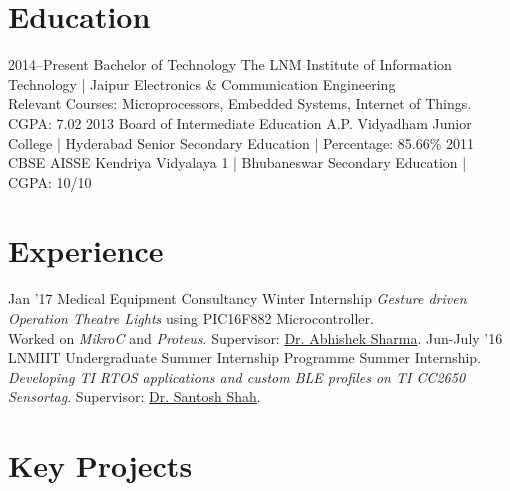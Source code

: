 \documentclass[]{friggeri-cv}
\begin{document}
\section{Education}

\begin{entrylist}
   \entry
    {2014–Present}
    {Bachelor of Technology}
    {The LNM Institute of Information Technology | Jaipur}
    {Electronics \& Communication Engineering\\Relevant Courses: Microprocessors, Embedded Systems, Internet of Things.\\CGPA: 7.02}
  \entry
    {2013}
    {Board of Intermediate Education A.P.}
    {Vidyadham Junior College | Hyderabad}
    {Senior Secondary Education | Percentage: 85.66\%}
  \entry
    {2011}
    {CBSE AISSE}
    {Kendriya Vidyalaya 1 | Bhubaneswar}
    {Secondary Education | CGPA: 10/10}
\end{entrylist}

\section{Experience}

\begin{entrylist}
  \entry
    {Jan '17}
    {Medical Equipment Consultancy}
    {Winter Internship}
    {\emph{Gesture driven Operation Theatre Lights} using PIC16F882 Microcontroller.\\Worked on \textit{MikroC} and \textit{Proteus}. Supervisor: \href{http://lnmiit.ac.in/Department/ECE/ece_FacultyProfile.aspx?nDeptID=119}{Dr. Abhishek Sharma}.}
  \entry
    {Jun-July ’16}
    {LNMIIT Undergraduate Summer Internship Programme}
    {Summer Internship.}
    {\emph{Developing TI RTOS applications and custom BLE profiles on TI CC2650 Sensortag}. Supervisor: \href{http://www.lnmiit.ac.in/Department/ECE/ece_FacultyProfile.aspx?nDeptID=189}{Dr. Santosh Shah}.}
\end{entrylist}

\section{Key Projects}
\end{document}
